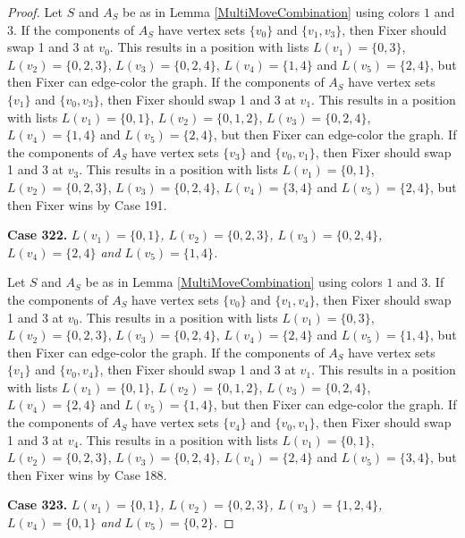 \documentclass[12pt]{amsart}
\theoremstyle{plain}
\theoremstyle{definition}
\theoremstyle{remark}
\begin{document}
\begin{proof}
Let $S$ and $A_S$ be as in Lemma \ref{MultiMoveCombination} using colors $1$ and $3$. If the components of $A_S$ have vertex sets $\{v_0\}$ and $\{v_1, v_3\}$, then Fixer should swap 1 and 3 at $v_0$. This results in a position with lists $L(v_1) = \{0, 3\}$, $L(v_2) = \{0, 2, 3\}$, $L(v_3) = \{0, 2, 4\}$, $L(v_4) = \{1, 4\}$ and $L(v_5) = \{2, 4\}$, but then Fixer can edge-color the graph. If the components of $A_S$ have vertex sets $\{v_1\}$ and $\{v_0, v_3\}$, then Fixer should swap 1 and 3 at $v_1$. This results in a position with lists $L(v_1) = \{0, 1\}$, $L(v_2) = \{0, 1, 2\}$, $L(v_3) = \{0, 2, 4\}$, $L(v_4) = \{1, 4\}$ and $L(v_5) = \{2, 4\}$, but then Fixer can edge-color the graph. If the components of $A_S$ have vertex sets $\{v_3\}$ and $\{v_0, v_1\}$, then Fixer should swap 1 and 3 at $v_3$. This results in a position with lists $L(v_1) = \{0, 1\}$, $L(v_2) = \{0, 2, 3\}$, $L(v_3) = \{0, 2, 4\}$, $L(v_4) = \{3, 4\}$ and $L(v_5) = \{2, 4\}$, but then Fixer wins by Case 191. 

\noindent\textbf{Case 322.  }\textit{$L(v_1) = \{0, 1\}$, $L(v_2) = \{0, 2, 3\}$, $L(v_3) = \{0, 2, 4\}$, $L(v_4) = \{2, 4\}$ and $L(v_5) = \{1, 4\}$.}

Let $S$ and $A_S$ be as in Lemma \ref{MultiMoveCombination} using colors $1$ and $3$. If the components of $A_S$ have vertex sets $\{v_0\}$ and $\{v_1, v_4\}$, then Fixer should swap 1 and 3 at $v_0$. This results in a position with lists $L(v_1) = \{0, 3\}$, $L(v_2) = \{0, 2, 3\}$, $L(v_3) = \{0, 2, 4\}$, $L(v_4) = \{2, 4\}$ and $L(v_5) = \{1, 4\}$, but then Fixer can edge-color the graph. If the components of $A_S$ have vertex sets $\{v_1\}$ and $\{v_0, v_4\}$, then Fixer should swap 1 and 3 at $v_1$. This results in a position with lists $L(v_1) = \{0, 1\}$, $L(v_2) = \{0, 1, 2\}$, $L(v_3) = \{0, 2, 4\}$, $L(v_4) = \{2, 4\}$ and $L(v_5) = \{1, 4\}$, but then Fixer can edge-color the graph. If the components of $A_S$ have vertex sets $\{v_4\}$ and $\{v_0, v_1\}$, then Fixer should swap 1 and 3 at $v_4$. This results in a position with lists $L(v_1) = \{0, 1\}$, $L(v_2) = \{0, 2, 3\}$, $L(v_3) = \{0, 2, 4\}$, $L(v_4) = \{2, 4\}$ and $L(v_5) = \{3, 4\}$, but then Fixer wins by Case 188. 

\noindent\textbf{Case 323.  }\textit{$L(v_1) = \{0, 1\}$, $L(v_2) = \{0, 2, 3\}$, $L(v_3) = \{1, 2, 4\}$, $L(v_4) = \{0, 1\}$ and $L(v_5) = \{0, 2\}$.}


\end{proof}
\end{document}

